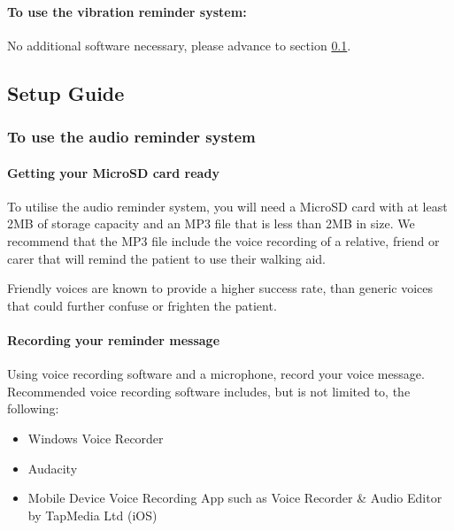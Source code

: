 			\paragraph{To use the vibration reminder system:}\mbox{}

			No additional software necessary, please advance to section \ref{subsec:quick_start_setup_guide}.

		\subsection{Setup Guide}
		\label{subsec:quick_start_setup_guide}

			\subsubsection{To use the audio reminder system}

				\paragraph{Getting your MicroSD card ready}\mbox{}

				To utilise the audio reminder system, you will need a MicroSD card with at least 2MB of storage capacity and an MP3 file that is less than 2MB in size. We recommend that the MP3 file include the voice recording of a relative, friend or carer that will remind the patient to use their walking aid. 

				Friendly voices are known to provide a higher success rate, than generic voices that could further confuse or frighten the patient.

				\paragraph{Recording your reminder message}\mbox{}

				Using voice recording software and a microphone, record your voice message. Recommended voice recording software includes, but is not limited to, the following:

				\begin{itemize}
					\item Windows Voice Recorder
					\item Audacity
					\item Mobile Device Voice Recording App such as Voice Recorder \& Audio Editor by TapMedia Ltd (iOS)
				\end{itemize}

